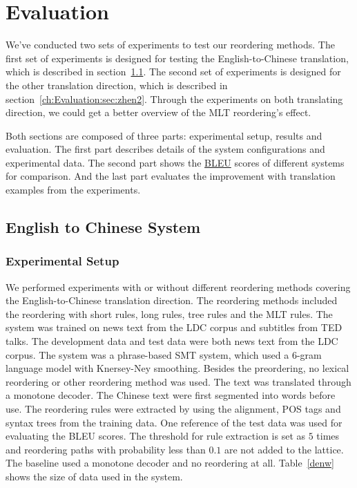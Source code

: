
\chapter{Evaluation}
\label{ch:Evaluation}

We've conducted two sets of experiments to test our reordering methods. The first set of experiments is designed for testing the English-to-Chinese translation, which is described in section~\ref{ch:Evaluation:sec:enw}. The second set of experiments is designed for the other translation direction, which is described in section~\ref{ch:Evaluation:sec:zhen2}. Through the experiments on both translating direction, we could get a better overview of the MLT reordering's effect.

Both sections are composed of three parts: experimental setup, results and evaluation. The first part describes details of the system configurations and experimental data. The second part shows the \hyperref[ch:Foundations:sec:bleu]{BLEU} scores of different systems for comparison. And the last part evaluates the improvement with translation examples from the experiments.


\section{English to Chinese System}
\label{ch:Evaluation:sec:enw}

\subsection{Experimental Setup}
We performed experiments with or without different reordering methods covering the English-to-Chinese translation direction. The reordering methods included the reordering with short rules, long rules, tree rules and the MLT rules. The system was trained on news text from the LDC corpus and subtitles from TED talks. The development data and test data were both news text from the LDC corpus. The system was a phrase-based SMT system, which used a $6$-gram language model with Knersey-Ney smoothing. Besides the preordering, no lexical reordering or other reordering method was used. The text was translated through a monotone decoder. The Chinese text were first segmented into words before use.
The reordering rules were extracted by using the alignment, POS tags and syntax trees from the training data. One reference of the test data was used for evaluating the BLEU scores. The threshold for rule extraction is set as $5$ times and reordering paths with probability less than $0.1$ are not added to the lattice. The baseline used a monotone decoder and no reordering at all. Table~\ref{denw} shows the size of data used in the system. %

